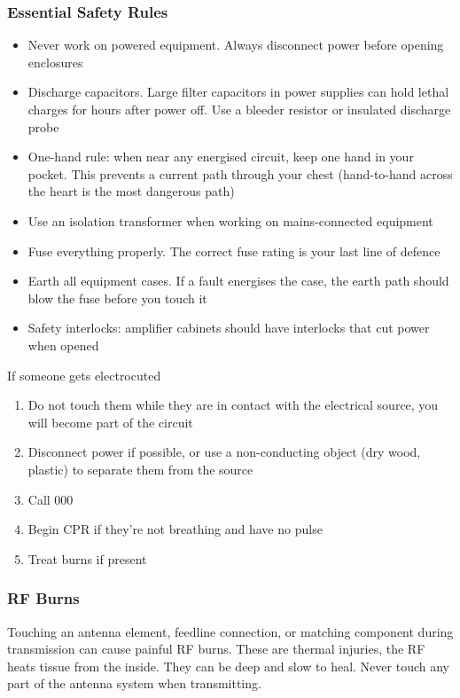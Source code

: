 \documentclass{article}
\begin{document}
\subsubsection{Essential Safety Rules}
\begin{itemize}
    \item Never work on powered equipment. Always disconnect power before opening enclosures
    \item Discharge capacitors. Large filter capacitors in power supplies can hold lethal charges for hours after power off. Use a bleeder resistor or insulated discharge probe
    \item One-hand rule: when near any energised circuit, keep one hand in your pocket. This prevents a current path through your chest (hand-to-hand across the heart is the most dangerous path)
    \item Use an isolation transformer when working on mains-connected equipment
    \item Fuse everything properly. The correct fuse rating is your last line of defence
    \item Earth all equipment cases. If a fault energises the case, the earth path should blow the fuse before you touch it
    \item Safety interlocks: amplifier cabinets should have interlocks that cut power when opened
\end{itemize}
If someone gets electrocuted
\begin{enumerate}
    \item Do not touch them while they are in contact with the electrical source, you will become part of the circuit
    \item Disconnect power if possible, or use a non-conducting object (dry wood, plastic) to separate them from the source
    \item Call 000
    \item Begin CPR if they're not breathing and have no pulse
    \item Treat burns if present
\end{enumerate}

\subsubsection{RF Burns}
Touching an antenna element, feedline connection, or matching component during transmission can cause painful RF burns. These are thermal injuries, the RF heats tissue from the inside. They can be deep and slow to heal. Never touch any part of the antenna system when transmitting.
\end{document}
